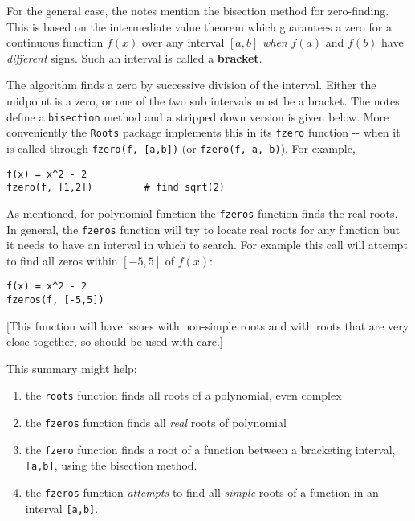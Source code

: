 \documentclass[12pt]{article}
\begin{document}
For the general case, the notes mention the bisection method for
zero-finding. This is based on the intermediate value theorem which
guarantees a zero for a continuous function $f(x)$ over any interval
$[a,b]$ \emph{when} $f(a)$ and $f(b)$ have \emph{different} signs. Such
an interval is called a \textbf{bracket}.

The algorithm finds a zero by successive division of the interval.
Either the midpoint is a zero, or one of the two sub intervals must be a
bracket. The notes define a \texttt{bisection} method and a stripped
down version is given below. More conveniently the \texttt{Roots}
package implements this in its \texttt{fzero} function -{}- when it is
called through \texttt{fzero(f, {[}a,b{]})} (or
\texttt{fzero(f, a, b)}). For example,



\begin{verbatim}
f(x) = x^2 - 2
fzero(f, [1,2])         # find sqrt(2)
\end{verbatim}
As mentioned, for polynomial function the \texttt{fzeros} function finds
the real roots. In general, the \texttt{fzeros} function will try to
locate real roots for any function but it needs to have an interval in
which to search. For example this call will attempt to find all zeros
within $[-5,5]$ of $f(x)$:



\begin{verbatim}
f(x) = x^2 - 2
fzeros(f, [-5,5])
\end{verbatim}
{[}This function will have issues with non-simple roots and with roots
that are very close together, so should be used with care.{]}

This summary might help:

\begin{enumerate}
\def\labelenumi{\arabic{enumi})}
\itemsep1pt\parskip0pt
\item
  the \texttt{roots} function finds all roots of a polynomial, even
  complex
\item
  the \texttt{fzeros} function finds all \emph{real} roots of polynomial
\item
  the \texttt{fzero} function finds a root of a function between a
  bracketing interval, \texttt{{[}a,b{]}}, using the bisection method.
\item
  the \texttt{fzeros} function \emph{attempts} to find all \emph{simple}
  roots of a function in an interval \texttt{{[}a,b{]}}.
\end{enumerate}
\end{document}

